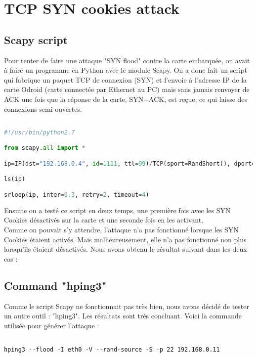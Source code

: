 \section{TCP SYN cookies attack}
\subsection{Scapy script}

Pour tenter de faire une attaque "SYN flood" contre la carte embarquée, on avait à faire un programme en Python avec le module Scapy. On a donc fait un script qui fabrique un paquet TCP de connexion (SYN) et l'envoie à l'adresse IP de la carte Odroid (carte connectée par Ethernet au PC) mais sans jamais renvoyer de ACK une fois que la réponse de la carte, SYN+ACK, est reçue, ce qui laisse des connexions semi-ouvertes.\\

\begin{lstlisting}[frame=single,language=Python]  % Start your code-block

#!/usr/bin/python2.7

from scapy.all import *

ip=IP(dst="192.168.0.4", id=1111, ttl=99)/TCP(sport=RandShort(), dport=[22, 80], seq=12345, ack=1000, window=1000, flags="S")/""

ls(ip)

srloop(ip, inter=0.3, retry=2, timeout=4)
\end{lstlisting}

Ensuite on a testé ce script en deux temps, une première fois avec les SYN Cookies désactivés sur la carte et une seconde fois en les activant.\\

Comme on pouvait s'y attendre, l'attaque n'a pas fonctionné lorsque les SYN Cookies étaient activés. Mais malheureusement, elle n'a pas fonctionné non plus lorsqu'ils étaient désactivés. Nous avons obtenu le résultat suivant dans les deux cas :




\pagebreak
\subsection{Command "hping3"}
Comme le script Scapy ne fonctionnait pas très bien, nous avons décidé de tester un autre outil : "hping3". Les résultats sont très concluant. Voici la commande utilisée pour générer l'attaque :
\begin{lstlisting}[frame=single,style=Console]  % Start your code-block

hping3 --flood -I eth0 -V --rand-source -S -p 22 192.168.0.11
\end{lstlisting}


